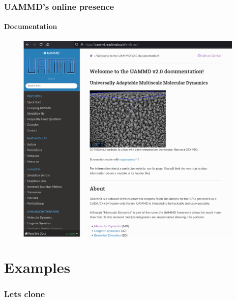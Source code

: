 \documentclass[xcolor=dvipsnames, compress]{beamer}
\begin{document}
\begin{frame}
  \frametitle{UAMMD's online presence}
  \framesubtitle{Documentation}
  {}
  \begin{figure}
    \centering
    \includegraphics[height=0.7\paperheight]{gfx/uammdreadthedocs}
  \end{figure}
\end{frame}

\section{Examples}


\begin{frame}[fragile]
  \frametitle{Lets clone}
  \begin{center}
    \Large
  \end{center}
\end{frame}
\end{document}

